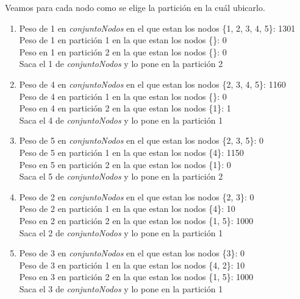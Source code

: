 \documentclass[10pt,a4paper]{article}
\begin{document}
Veamos para cada nodo como se elige la partición en la cuál ubicarlo.

\begin{enumerate}

\item 
Peso de 1 en \textit{conjuntoNodos} en el que estan los nodos \{1, 2, 3, 4, 5\}: 1301\\
Peso de 1 en partición 1 en la que estan los nodos \{\}: 0 \\
Peso en 1 en partición 2 en la que estan los nodos \{\}: 0 \\

Saca el 1 de \textit{conjuntoNodos} y lo pone en la partición 2\\

\item
Peso de 4 en \textit{conjuntoNodos} en el que estan los nodos \{2, 3, 4, 5\}: 1160\\
Peso de 4 en partición 1 en la que estan los nodos \{\}: 0 \\
Peso en 4 en partición 2 en la que estan los nodos \{1\}: 1 \\

Saca el 4 de \textit{conjuntoNodos} y lo pone en la partición 1\\

\item
Peso de 5 en \textit{conjuntoNodos} en el que estan los nodos \{2, 3, 5\}: 0\\
Peso de 5 en partición 1 en la que estan los nodos \{4\}: 1150 \\
Peso en 5 en partición 2 en la que estan los nodos \{1\}: 0 \\

Saca el 5 de \textit{conjuntoNodos} y lo pone en la partición 2\\

\item
Peso de 2 en \textit{conjuntoNodos} en el que estan los nodos \{2, 3\}: 0\\
Peso de 2 en partición 1 en la que estan los nodos \{4\}: 10 \\
Peso en 2 en partición 2 en la que estan los nodos \{1, 5\}: 1000 \\

Saca el 2 de \textit{conjuntoNodos} y lo pone en la partición 1\\

\item
Peso de 3 en \textit{conjuntoNodos} en el que estan los nodos \{3\}: 0\\
Peso de 3 en partición 1 en la que estan los nodos \{4, 2\}: 10 \\
Peso en 3 en partición 2 en la que estan los nodos \{1, 5\}: 1000 \\

Saca el 3 de \textit{conjuntoNodos} y lo pone en la partición 1\\
\end{enumerate}
\end{document}
